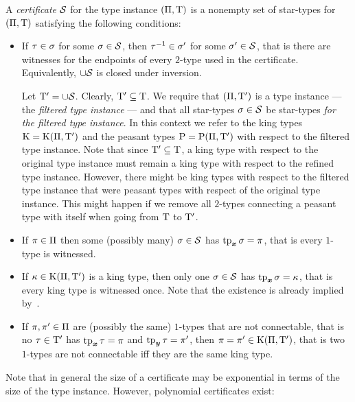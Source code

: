 \begin{definition}
A \emph{certificate} $\mathcal{S}$ for the type instance $(\Pi,\mathrm{T})$ is a
nonempty set of star-types for $(\Pi,\mathrm{T})$ satisfying the following
conditions:
\begin{itemize}
  \item[\certcond1]\label{cond:cert-1} If $\tau\in\sigma$ for some
  $\sigma\in\mathcal{S}$, then $\tau^{-1}\in\sigma'$ for some $\sigma'\in\mathcal{S}$, that is there are witnesses
  for the endpoints of every $2$-type used in the certificate.
  Equivalently, $\cup\mathcal{S}$ is closed under inversion.
  
  Let ${\mathrm{T}'} = \cup\mathcal{S}$.
  Clearly, ${\mathrm{T}'}\subseteq\mathrm{T}$. We require that $(\Pi,{\mathrm{T}'})$ is a type
  instance --- the \emph{filtered type instance} --- and that all star-types
  $\sigma\in\mathcal{S}$ be star-types \emph{for the filtered type instance}.
  In this context we refer to the king types $\mathrm{K} = \mathrm{K}(\Pi,{\mathrm{T}'})$ and the
  peasant types $\mathrm{P} = \mathrm{P}(\Pi,{\mathrm{T}'})$ with respect to the filtered type
  instance. Note that since ${\mathrm{T}'} \subseteq \mathrm{T}$, a king type with respect
  to the original type instance must remain a king type with respect to the
  refined type instance. However, there might be king types with respect to the
  filtered type instance that were peasant types with respect of the original
  type instance. This might happen if we remove all $2$-types connecting a
  peasant type with itself when going from $\mathrm{T}$ to ${\mathrm{T}'}$.
  \item[\certcond2]\label{cond:cert-2} If $\pi \in \Pi$ then some (possibly
  many) $\sigma \in \mathcal{S}$ has $\operatorname{tp}_{\bm{x}}\sigma = \pi$, that is every $1$-type is witnessed.
  \item[\certcond3]\label{cond:cert-3} If $\kappa \in \mathrm{K}(\Pi,{\mathrm{T}'})$ is a king
  type, then only one $\sigma \in \mathcal{S}$ has $\operatorname{tp}_{\bm{x}}\sigma = \kappa$, that is every
  king type is witnessed once.
  Note that the existence is already implied by~.
  \item[\certcond4]\label{cond:cert-4} If $\pi,{\pi'} \in \Pi$ are (possibly
  the same) $1$-types that are not connectable, that is no $\tau\in{\mathrm{T}'}$ has
  $\operatorname{tp}_{\bm{x}}\tau = \pi$ and $\operatorname{tp}_{\bm{y}}\tau = {\pi'}$, then $\pi = {\pi'} \in
  \mathrm{K}(\Pi,{\mathrm{T}'})$, that is two $1$-types are not connectable iff they are
  the same king type.
\end{itemize}
\end{definition}
Note that in general the size of a certificate may be exponential in terms of
the size of the type instance. However, polynomial certificates exist:
